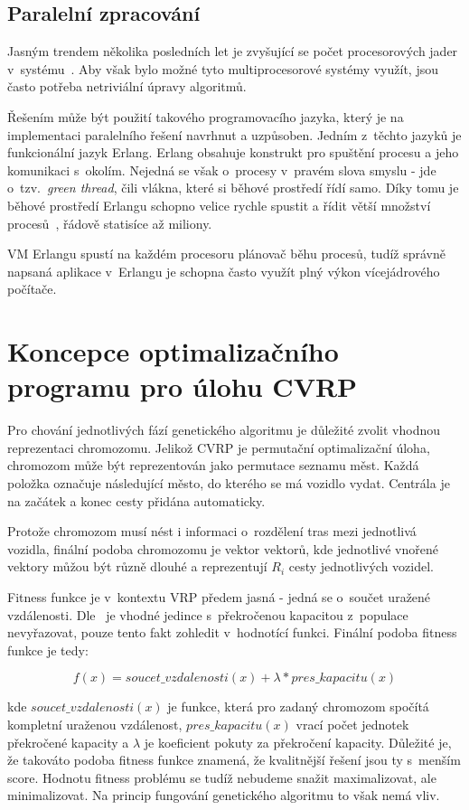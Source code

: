 \documentclass[a4paper]{article}
\begin{document}
\subsection{Paralelní zpracování}
Jasným trendem několika posledních let je zvyšující se počet procesorových jader v~systému~\cite{sekanina}. Aby však bylo možné tyto multiprocesorové systémy využít, jsou často potřeba netriviální úpravy algoritmů.

Řešením může být použití takového programovacího jazyka, který je na implementaci paralelního řešení navrhnut a uzpůsoben. Jedním z~těchto jazyků je funkcionální jazyk Erlang. Erlang obsahuje konstrukt pro spuštění procesu a jeho komunikaci s~okolím. Nejedná se však o~procesy v~pravém slova smyslu - jde o~tzv.\ \emph{green thread}, čili vlákna, které si běhové prostředí řídí samo. Díky tomu je běhové prostředí Erlangu schopno velice rychle spustit a řídit větší množství procesů~\cite{armstrong}, řádově statisíce až miliony.

VM Erlangu spustí na každém procesoru plánovač běhu procesů, tudíž správ\-ně napsaná aplikace v~Erlangu je schopna často využít plný výkon vícejádrového počítače.

\section{Koncepce optimalizačního programu pro ú\-lo\-hu CVRP}
Pro chování jednotlivých fází genetického algoritmu je důležité zvolit vhodnou reprezentaci chromozomu. Jelikož CVRP je permutační optimalizační úloha, chromozom může být reprezentován jako permutace seznamu měst. Každá po\-lož\-ka označuje ná\-sle\-du\-jící město, do kterého se má vozidlo vydat. Centrála je na začátek a konec cesty přidána automaticky.

Protože chromozom musí nést i informaci o~rozdělení tras mezi jednotlivá vozidla, finální podoba chromozomu je vektor vektorů, kde jednotlivé vnořené vektory můžou být různě dlouhé a reprezentují $R_i$ cesty jednotlivých vozidel.

Fitness funkce je v~kontextu VRP předem jasná - jedná se o~součet uražené vzdálenosti. Dle~\cite{cneo} je vhodné jedince s~překročenou kapacitou z~populace ne\-vy\-řa\-zo\-vat, pouze tento fakt zohledit v~hodnotící funkci. Finální podoba fitness funkce je tedy:

\[f(x) = soucet\_vzdalenosti(x) + \lambda*pres\_kapacitu(x)\]

\noindent kde $soucet\_vzdalenosti(x)$ je funkce, která pro zadaný chromozom spočítá kompletní uraženou vzdálenost, $pres\_kapacitu(x)$ vrací počet jednotek překročené kapacity a $\lambda$ je koeficient pokuty za překročení kapacity. Důležité je, že takováto podoba fitness funkce znamená, že kvalitnější řešení jsou ty s~menším score. Hodnotu fitness problému se tudíž nebudeme snažit maximalizovat, ale minimalizovat. Na princip fungování genetického algoritmu to však nemá vliv.
\end{document}
